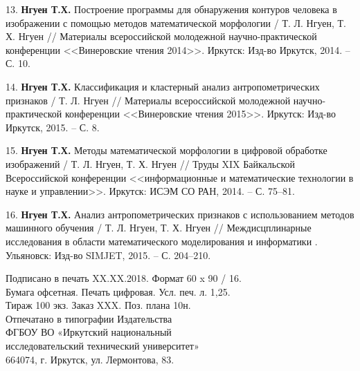 13. \textbf{Нгуен Т.Х.} Построение программы для обнаружения контуров человека в изображении с помощью методов математической морфологии / Т. Л. Нгуен, Т. Х. Нгуен // Материалы всероссийской молодежной научно-практической конференции <<Винеровские чтения 2014>>. Иркутск: Изд-во Иркутск, 2014. -- С. 10.

14. \textbf{Нгуен Т.Х.} Классификация и кластерный анализ антропометрических признаков / Т. Л. Нгуен // Материалы всероссийской молодежной научно-практической конференции <<Винеровские чтения 2015>>. Иркутск: Изд-во Иркутск, 2015. -- С. 8.

15. \textbf{Нгуен Т.Х.} Методы математической морфологии в цифровой обработке изображений / Т. Л. Нгуен, Т. Х. Нгуен // Труды XIX Байкальской Всероссийской конференции <<информационные и математические технологии в науке и управлении>>. Иркутск: ИСЭМ СО РАН, 2014. -- С. 75--81.

16. \textbf{Нгуен Т.Х.} Анализ антропометрических признаков с использованием методов машинного обучения / Т. Л. Нгуен, Т. Х. Нгуен // Междисцплинарные исследования в области математического моделирования и информатики . Ульяновск: Изд-во SIMJET, 2015. -- С. 204--210.

\begin{center}
\vspace{0.6cm}
Подписано в печать XX.XX.2018. Формат 60 x 90 / 16.\\
Бумага офсетная. Печать цифровая. Усл. печ. л. 1,25.\\
Тираж 100 экз. Заказ XXX. Поз. плана 10н.\\
\vspace{0.6cm}
Отпечатано в типографии Издательства\\
ФГБОУ ВО «Иркутский национальный\\
исследовательский технический университет»\\
664074, г. Иркутск, ул. Лермонтова, 83.
\end{center}
\thispagestyle{empty}
